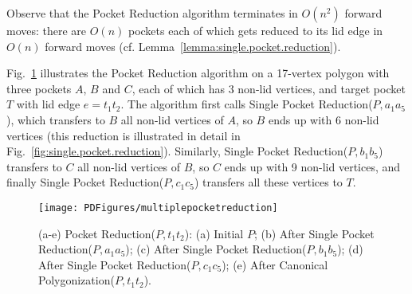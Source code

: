 \pdfoutput=1  \documentclass{article}
\newcommand{\figlab}[1]{\label{fig:#1}}
\newcommand{\lemref}[1]{\ref{lemma:#1}}
\newcommand{\figref}[1]{\ref{fig:#1}}
\begin{document}
\vspace{-0.2em}
\begin{center}
\vspace{1mm} \vspace{1mm}
\end{center}




\vspace{-0.2em} Observe that the {\sc Pocket Reduction} algorithm
terminates in $O(n^2)$ forward moves: there are $O(n)$ pockets 
each of which gets reduced to its lid edge in $O(n)$ forward moves
(cf. Lemma~\lemref{single.pocket.reduction}).

Fig.~\figref{manytoone.example} illustrates the {\sc Pocket
Reduction} algorithm on a 17-vertex polygon with three pockets $A$,
$B$ and $C$, 
each of which has 3 non-lid vertices,
and target pocket $T$ with lid edge $e = t_1t_2$. 
The algorithm first
calls {\sc Single Pocket Reduction}($P, a_1a_5$), which transfers to
$B$ all non-lid vertices of $A$, so $B$ ends up with 6 non-lid
vertices (this reduction is illustrated in detail in
Fig.~\figref{single.pocket.reduction}). Similarly, {\sc Single
Pocket Reduction}($P, b_1b_5$) transfers to $C$ all non-lid vertices
of $B$, so $C$ ends up with 9 non-lid vertices, and finally {\sc
Single Pocket Reduction}($P, c_1c_5$) transfers all these vertices
to $T$.

\begin{figure}[htbp]
\centering
\texttt{[image: PDFigures/multiplepocketreduction]}
\vspace{-2em}\caption{(a-e) \small{{\sc Pocket Reduction}($P,
t_1t_2$): (a) Initial $P$; (b) After {\sc Single Pocket
Reduction}($P, a_1a_5$); (c) After {\sc Single Pocket Reduction}($P,
b_1b_5$); (d) After {\sc Single Pocket Reduction}($P, c_1c_5$);
(e) After {\sc Canonical Polygonization}($P, t_1t_2$).}}
\figlab{manytoone.example}
\end{figure}
\end{document}
